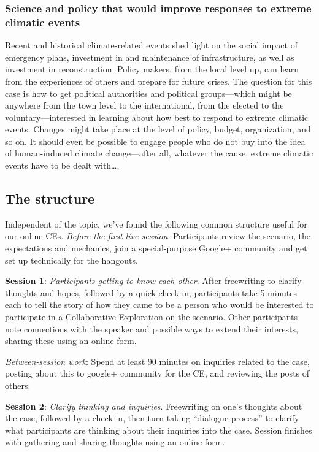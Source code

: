 \subsubsection{Science and policy that would improve responses to
extreme climatic events}

Recent and historical climate-related events shed light on the social
impact of emergency plans, investment in and maintenance of
infrastructure, as well as investment in reconstruction. Policy makers,
from the local level up, can learn from the experiences of others and
prepare for future crises. The question for this case is how to get
political authorities and political groups---which might be anywhere
from the town level to the international, from the elected to the
voluntary---interested in learning about how best to respond to extreme
climatic events. Changes might take place at the level of policy,
budget, organization, and so on. It should even be possible to engage
people who do not buy into the idea of human-induced climate
change---after all, whatever the cause, extreme climatic events have to
be dealt with\ldots{}.

\subsection{The structure}

Independent of the topic, we've found the following common structure
useful for our online CEs. \emph{Before the first live session}:
Participants review the scenario, the expectations and mechanics, join a
special-purpose Google+ community and get set up technically for the
hangouts.

\textbf{Session 1}: \emph{Participants getting to know each
other}. After freewriting to clarify thoughts and hopes, followed by a
quick check-in, participants take 5 minutes each to tell the story of
how they came to be a person who would be interested to participate in a
Collaborative Exploration on the scenario. Other participants note
connections with the speaker and possible ways to extend their
interests, sharing these using an online form.

\emph{Between-session
work}: Spend at least 90 minutes on inquiries related to the case,
posting about this to google+ community for the CE, and reviewing the
posts of others.

\textbf{Session 2}: \emph{Clarify thinking and
inquiries}. Freewriting on one's thoughts about the case, followed by a
check-in, then turn-taking ``dialogue process'' to clarify what
participants are thinking about their inquiries into the case. Session
finishes with gathering and sharing thoughts using an online form.

